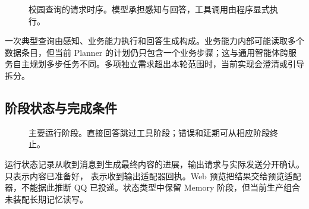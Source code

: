 \begin{figure}[H]\centering

\caption{校园查询的请求时序。模型承担感知与回答，工具调用由程序显式执行。}
\label{fig:sequence}
\end{figure}

一次典型查询由感知、业务能力执行和回答生成构成。业务能力内部可能读取多个数据条目，但当前 Planner 的计划仍只包含一个业务步骤；这与通用智能体跨服务自主规划多步任务不同。多项独立需求超出本轮范围时，当前实现会澄清或引导拆分。

\subsection{阶段状态与完成条件}
\begin{figure}[H]\centering

\caption{主要运行阶段。直接回答跳过工具阶段；错误和延期可从相应阶段终止。}
\end{figure}

运行状态记录从收到消息到生成最终内容的进展，输出请求与实际发送分开确认。 只表示内容已准备好， 表示收到输出适配器回执。Web 预览把结果交给预览适配器，不能据此推断 QQ 已投递。状态类型中保留 Memory 阶段，但当前生产组合未装配长期记忆读写。
